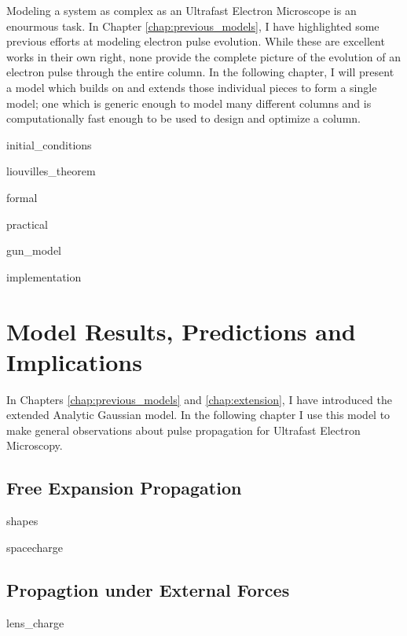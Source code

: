 \documentclass{uicthesi}
\begin{document}
Modeling a system as complex as an Ultrafast Electron Microscope is an enourmous task.
In Chapter \ref{chap:previous_models}, I have highlighted some previous efforts at modeling electron pulse evolution.
While these are excellent works in their own right, none provide the complete picture of the evolution of an electron pulse through the entire column.
In the following chapter, I will present a model which builds on and extends those individual pieces to form a single model; one which is generic enough to model many different columns and is computationally fast enough to be used to design and optimize a column.

  {initial_conditions}

  {liouvilles_theorem}


  {formal}

  {practical}

  {gun_model}

  {implementation}

\chapter{Model Results, Predictions and Implications}

In Chapters \ref{chap:previous_models} and \ref{chap:extension}, I have introduced the extended Analytic Gaussian model.
In the following chapter I use this model to make general observations about pulse propagation for Ultrafast Electron Microscopy.

\section{Free Expansion Propagation}

  {shapes}

  {spacecharge}

\section{Propagtion under External Forces}

  {lens_charge}
\end{document}
